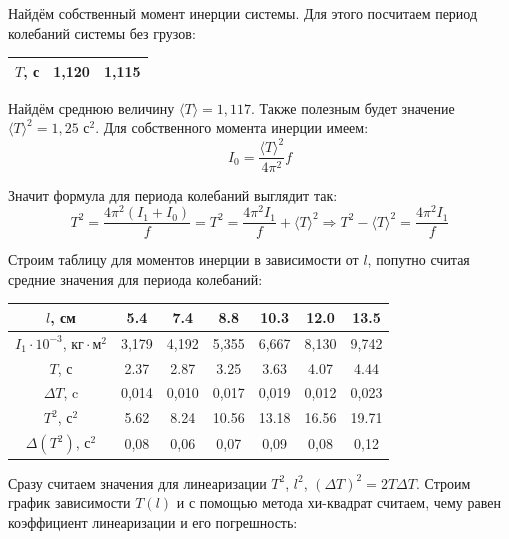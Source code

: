 \documentclass[12pt, a4paper]{article}
\begin{document}
Найдём собственный момент инерции системы. Для этого посчитаем период колебаний системы без грузов:

\begin{center}
\begin{tabular}{|c|c|c|}
\hline 
$T$, с & 1,120 & 1,115 \\ 
\hline 
\end{tabular}
\end{center} 

Найдём среднюю величину $\langle T \rangle = 1,117$. Также полезным будет значение $\langle T \rangle^2 = 1,25 \text{ с}^2$. Для собственного момента инерции имеем:
\[I_0 = \frac{\langle T \rangle^2}{4\pi^2}f\]

Значит формула для периода колебаний выглядит так:
\[T^2 = \frac{4\pi^2 (I_1 + I_0)}{f} = T^2 = \frac{4\pi^2 I_1}{f} + \langle T \rangle^2 \Rightarrow T^2 - \langle T \rangle^2 = \frac{4\pi^2 I_1}{f}\]

Строим таблицу для моментов инерции в зависимости от $l$, попутно считая средние значения для периода колебаний:\\

\begin{center}
\begin{tabular}{|c|c|c|c|c|c|c|}
\hline 
$l$, см & 5.4 & 7.4 & 8.8 & 10.3 & 12.0 & 13.5 \\ 
\hline 
$I_1 \cdot 10^{-3}$, $\text{кг} \cdot \text{м}^2$  & 3,179 & 4,192 & 5,355 & 6,667 & 8,130 & 9,742 \\ 
\hline 
$T$, с & 2.37 & 2.87 & 3.25 & 3.63 & 4.07 & 4.44 \\ 
\hline 
$\Delta T$, c & 0,014 & 0,010 & 0,017 & 0,019 & 0,012 & 0,023 \\ 
\hline
$T^2$, $\text{с}^2$ & 5.62 & 8.24 & 10.56 & 13.18 & 16.56 & 19.71 \\ 
\hline 
$\Delta (T^2)$, $\text{с}^2$ & 0,08 & 0,06 & 0,07 & 0,09 & 0,08 & 0,12 \\ 
\hline 
\end{tabular}
\end{center}   

Сразу считаем значения для линеаризации $T^2$, $l^2$, $(\Delta T)^2 = 2 T \Delta T$. Строим график зависимости $T(l)$ и с помощью метода хи-квадрат считаем, чему равен коэффициент линеаризации и его погрешность:
\end{document}

